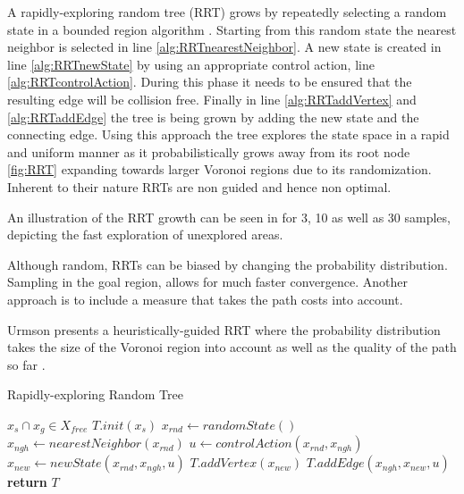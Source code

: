 A rapidly-exploring random tree (RRT) grows by repeatedly selecting a random state in a bounded region algorithm . Starting from this random state the nearest neighbor is selected in line \ref{alg:RRTnearestNeighbor}. A new state is created in line \ref{alg:RRTnewState} by using an appropriate control action, line \ref{alg:RRTcontrolAction}. During this phase it needs to be ensured that the resulting edge will be collision free. Finally in line \ref{alg:RRTaddVertex} and \ref{alg:RRTaddEdge} the tree is being grown by adding the new state and the connecting edge. Using this approach the tree explores the state space in a rapid and uniform manner as it probabilistically grows away from its root node \ref{fig:RRT} expanding towards larger Voronoi regions due to its randomization. Inherent to their nature RRTs are non guided and hence non optimal. \cite{Lavalle.1999}

An illustration of the RRT growth can be seen in  for 3, 10 as well as 30 samples, depicting the fast exploration of unexplored areas.

Although random, RRTs can be biased by changing the probability distribution. Sampling in the goal region, allows for much faster convergence. Another approach is to include a measure that takes the path costs into account. \cite{Lavalle.1999}

Urmson presents a heuristically-guided RRT where the probability distribution takes the size of the Voronoi region into account as well as the quality of the path so far \cite{Urmson.2003}.

\begin{algorithm}
    \caption{Rapidly-exploring Random Tree}\label{alg:RRT}
    \begin{algorithmic}[1]
        \Require $x_s \cap x_g \in X_{free}$
        \State $T.init(x_s)$
            \State $x_{rnd} \gets randomState()$ \label{alg:RRTrandomState}
            \State $x_{ngh} \gets nearestNeighbor(x_{rnd})$ \label{alg:RRTnearestNeighbor}
            \State $u \gets controlAction(x_{rnd}, x_{ngh})$ \label{alg:RRTcontrolAction}
            \State $x_{new} \gets newState(x_{rnd}, x_{ngh}, u)$ \label{alg:RRTnewState}
            \State $T.addVertex(x_{new})$ \label{alg:RRTaddVertex}
            \State $T.addEdge(x_{ngh}, x_{new}, u)$ \label{alg:RRTaddEdge}
        \EndWhile
        \State \textbf{return} $T$
    \end{algorithmic}
\end{algorithm}

